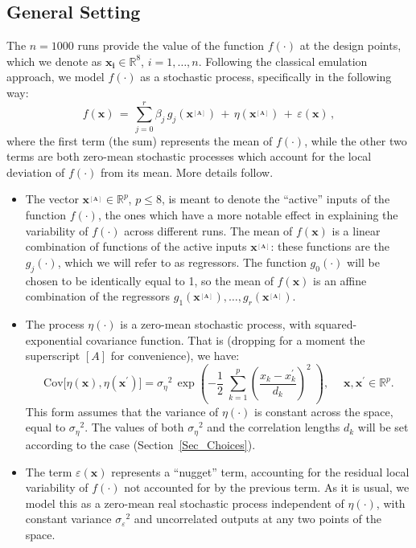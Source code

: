 \documentclass[a4paper, 12pt]{article}
\newcommand{\R}{\mathbb{R}}
\newcommand{\bd}[1]{\boldsymbol{#1}}
\newcommand{\x}{\bd x}
\newcommand{\A}{{_{[A]}}}
\newcommand{\xA}{\bd{x^\A}}
\newcommand{\eps}{\varepsilon}
\begin{document}
\subsection{General Setting}\label{Sec_General}
The $n=1000$ runs provide the value of the function $f(\cdot)$ at the design points, 
which we denote as $\bd{x_i} \in \R^8$, $i=1, \dots, n$.
Following the classical emulation approach, we model $f(\cdot)$ as a stochastic process, specifically in the following way:
\begin{equation}\label{f}
 f(\x) \,=\, \sum_{j=0}^r \beta_j \, g_j(\bd{x^\A}) \,+\, \eta(\bd{x^\A}) \,+\, \eps(\x) \,,
\end{equation}
where the first term (the sum) represents the mean of $f(\cdot)$, while the other two terms are both zero-mean stochastic processes which account for the local deviation of 
$f(\cdot)$ from its mean. More details follow.

\begin{itemize}
 \item The vector $\bd{x^\A} \in \R^p$, $p \leq 8$, is meant to denote the ``active''
       inputs of the function $f(\cdot)$, the ones which have a more notable effect in explaining the variability of $f(\cdot)$ across different runs. The mean of $f(\x)$ is a linear combination of functions of the active inputs $\xA$: these functions are the $g_j(\cdot)$, which we will refer to as regressors. The function $g_0(\cdot)$ will be chosen to be identically equal to 1, so the mean of $f(\x)$ is an affine combination of the regressors $g_1(\xA), \dots, g_r(\xA)$.
 \item The process $\eta(\cdot)$ is a zero-mean stochastic process, with 
       squared-exponential covariance function. That is (dropping for a moment the superscript $[A]$ for convenience), we have:
       \begin{equation}\label{Cov_fun}
         \text{Cov}\big[ \eta(\x), \eta(\x^\prime)  \big] = {\sigma_{\eta}}^2 \,
           \exp \left( 
              - \frac{1}{2} \; \sum_{k=1}^p \left(\frac{x_k - x^\prime_k}{d_k}\right)^2
           \; \right), 
           \quad\; \x, \x^\prime \in \R^p.
       \end{equation}
       This form assumes that the variance of $\eta(\cdot)$ is constant across the space, equal to ${\sigma_\eta}^2$. The values of both ${\sigma_\eta}^2$ and the correlation lengths $d_k$ will be set according to the case (Section~\ref{Sec_Choices}).
 \item The term $\eps(\x)$ represents a ``nugget'' term, accounting for the 
       residual local variability of $f(\cdot)$ not accounted for by the previous term. As it is usual, we model this as a zero-mean real stochastic process independent of $\eta(\cdot)$, with constant variance ${\sigma_\eps}^2$ and uncorrelated outputs at any two points of the space.
\end{itemize}
\end{document}
